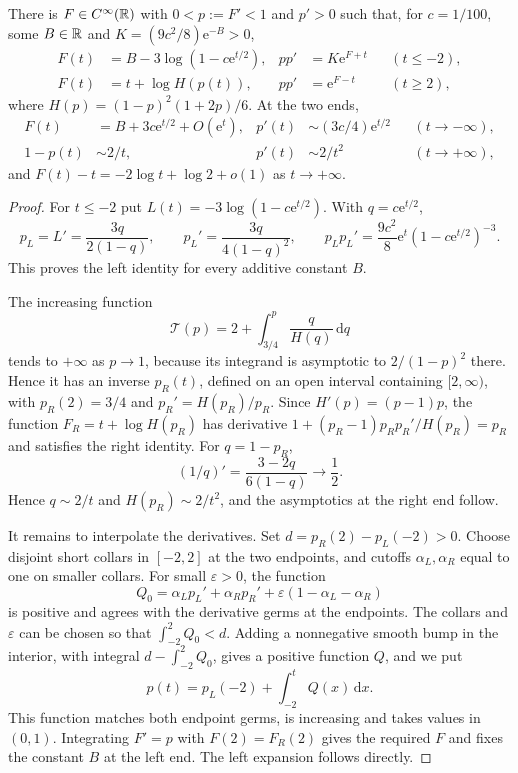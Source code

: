 \begin{lemma}\label{lem:nef-cusp-radial-profile}
There is $F\in C^\infty(\mathbb R)$ with $0<p:=F'<1$ and $p'>0$ such that, for $c=1/100$, some $B\in\mathbb R$ and $K=(9c^2/8)\mathrm{e}^{-B}>0$,
\begin{align}
 F(t)&=B-3\log(1-c\mathrm{e}^{t/2}),&
 pp'&=K\mathrm{e}^{F+t} &&(t\leq-2),\label{eq:nef-cusp-left-profile}\\
 F(t)&=t+\log H(p(t)),&
 pp'&=\mathrm{e}^{F-t} &&(t\geq2),\label{eq:nef-cusp-right-profile}
\end{align}
where $H(p)=(1-p)^2(1+2p)/6$. At the two ends,
\begin{align*}
 F(t)&=B+3c\mathrm{e}^{t/2}+O(\mathrm{e}^t),&
 p'(t)&\sim(3c/4)\mathrm{e}^{t/2} &&(t\to-\infty),\\
 1-p(t)&\sim2/t,&p'(t)&\sim2/t^2 &&(t\to+\infty),
\end{align*}
and $F(t)-t=-2\log t+\log2+o(1)$ as $t\to+\infty$.
\end{lemma}

\begin{proof}
For $t\leq-2$ put $L(t)=-3\log(1-c\mathrm{e}^{t/2})$. With $q=c\mathrm{e}^{t/2}$,
\[
 p_L=L'=\frac{3q}{2(1-q)},\qquad
 p_L'=\frac{3q}{4(1-q)^2},\qquad
 p_Lp_L'=\frac{9c^2}{8}\mathrm{e}^{t}(1-c\mathrm{e}^{t/2})^{-3}.
\]
This proves the left identity for every additive constant $B$.

The increasing function
\[
 \mathcal T(p)=2+\int_{3/4}^{p}\frac{q}{H(q)}\,\mathrm{d}q
\]
tends to $+\infty$ as $p\to1$, because its integrand is asymptotic to $2/(1-p)^2$ there. Hence it has an inverse $p_R(t)$, defined on an open interval containing $[2,\infty)$, with $p_R(2)=3/4$ and $p_R'=H(p_R)/p_R$. Since $H'(p)=(p-1)p$, the function $F_R=t+\log H(p_R)$ has derivative $1+(p_R-1)p_Rp_R'/H(p_R)=p_R$ and satisfies the right identity. For $q=1-p_R$,
\[
 (1/q)'=\frac{3-2q}{6(1-q)}\longrightarrow\frac12.
\]
Hence $q\sim2/t$ and $H(p_R)\sim2/t^2$, and the asymptotics at the right end follow.

It remains to interpolate the derivatives. Set $d=p_R(2)-p_L(-2)>0$. Choose disjoint short collars in $[-2,2]$ at the two endpoints, and cutoffs $\alpha_L,\alpha_R$ equal to one on smaller collars. For small $\varepsilon>0$, the function
\[
 Q_0=\alpha_Lp_L'+\alpha_Rp_R'
       +\varepsilon(1-\alpha_L-\alpha_R)
\]
is positive and agrees with the derivative germs at the endpoints. The collars and $\varepsilon$ can be chosen so that $\int_{-2}^2Q_0<d$. Adding a nonnegative smooth bump in the interior, with integral $d-\int_{-2}^2Q_0$, gives a positive function $Q$, and we put
\[
 p(t)=p_L(-2)+\int_{-2}^tQ(x)\,\mathrm{d}x.
\]
This function matches both endpoint germs, is increasing and takes values in $(0,1)$. Integrating $F'=p$ with $F(2)=F_R(2)$ gives the required $F$ and fixes the constant $B$ at the left end. The left expansion follows directly.
\end{proof}

